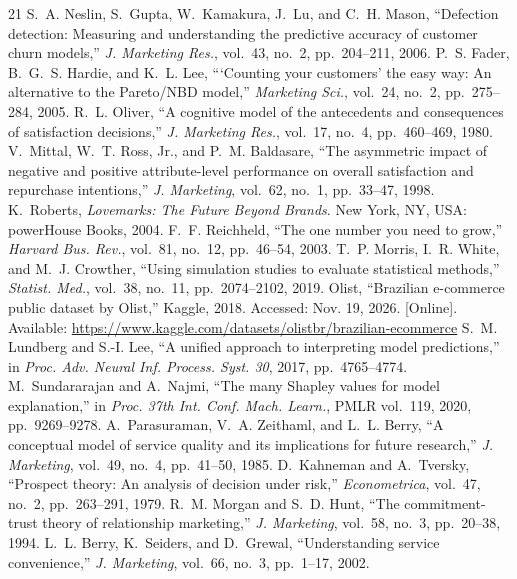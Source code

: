 \documentclass[10pt,twocolumn,letterpaper]{article}
\begin{document}
\footnotesize
\begin{thebibliography}{21}
\setlength{\itemsep}{1pt}
 S.~A. Neslin, S.~Gupta, W.~Kamakura, J.~Lu, and C.~H. Mason, ``Defection detection: Measuring and understanding the predictive accuracy of customer churn models,'' \textit{J. Marketing Res.}, vol.~43, no.~2, pp.~204--211, 2006.
 P.~S. Fader, B.~G.~S. Hardie, and K.~L. Lee, ```Counting your customers' the easy way: An alternative to the Pareto/NBD model,'' \textit{Marketing Sci.}, vol.~24, no.~2, pp.~275--284, 2005.
 R.~L. Oliver, ``A cognitive model of the antecedents and consequences of satisfaction decisions,'' \textit{J. Marketing Res.}, vol.~17, no.~4, pp.~460--469, 1980.
 V.~Mittal, W.~T. Ross, Jr., and P.~M. Baldasare, ``The asymmetric impact of negative and positive attribute-level performance on overall satisfaction and repurchase intentions,'' \textit{J. Marketing}, vol.~62, no.~1, pp.~33--47, 1998.
 K.~Roberts, \textit{Lovemarks: The Future Beyond Brands}. New York, NY, USA: powerHouse Books, 2004.
 F.~F. Reichheld, ``The one number you need to grow,'' \textit{Harvard Bus. Rev.}, vol.~81, no.~12, pp.~46--54, 2003.
 T.~P. Morris, I.~R. White, and M.~J. Crowther, ``Using simulation studies to evaluate statistical methods,'' \textit{Statist. Med.}, vol.~38, no.~11, pp.~2074--2102, 2019.
 Olist, ``Brazilian e-commerce public dataset by Olist,'' Kaggle, 2018. Accessed: Nov. 19, 2026. [Online]. Available: \url{https://www.kaggle.com/datasets/olistbr/brazilian-ecommerce}
 S.~M. Lundberg and S.-I. Lee, ``A unified approach to interpreting model predictions,'' in \textit{Proc. Adv. Neural Inf. Process. Syst. 30}, 2017, pp.~4765--4774.
 M.~Sundararajan and A.~Najmi, ``The many Shapley values for model explanation,'' in \textit{Proc. 37th Int. Conf. Mach. Learn.}, PMLR vol.~119, 2020, pp.~9269--9278.
 A.~Parasuraman, V.~A. Zeithaml, and L.~L. Berry, ``A conceptual model of service quality and its implications for future research,'' \textit{J. Marketing}, vol.~49, no.~4, pp.~41--50, 1985.
 D.~Kahneman and A.~Tversky, ``Prospect theory: An analysis of decision under risk,'' \textit{Econometrica}, vol.~47, no.~2, pp.~263--291, 1979.
 R.~M. Morgan and S.~D. Hunt, ``The commitment-trust theory of relationship marketing,'' \textit{J. Marketing}, vol.~58, no.~3, pp.~20--38, 1994.
 L.~L. Berry, K.~Seiders, and D.~Grewal, ``Understanding service convenience,'' \textit{J. Marketing}, vol.~66, no.~3, pp.~1--17, 2002.

\end{thebibliography}
\end{document}
